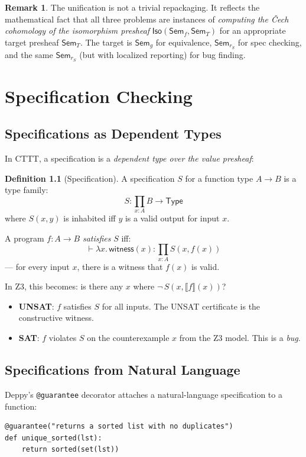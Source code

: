 \documentclass[11pt,a4paper]{report}
\theoremstyle{definition}
\newtheorem{definition}{Definition}[chapter]
\newtheorem{remark}[definition]{Remark}
\theoremstyle{plain}
\newcommand{\den}[1]{\llbracket #1 \rrbracket}
\newcommand{\Type}{\mathsf{Type}}
\newcommand{\Sem}{\mathsf{Sem}}
\newcommand{\Iso}{\mathsf{Iso}}
\begin{document}
\begin{remark}
The unification is not a trivial repackaging.  It reflects the
mathematical fact that all three problems are instances of
\emph{computing the \v{C}ech cohomology of the isomorphism presheaf}
$\Iso(\Sem_f, \Sem_T)$ for an appropriate target presheaf $\Sem_T$.
The target is $\Sem_g$ for equivalence, $\Sem_{r_S}$ for spec
checking, and the same $\Sem_{r_S}$ (but with localized reporting)
for bug finding.
\end{remark}


\chapter{Specification Checking}
\label{ch:spec-checking}

\section{Specifications as Dependent Types}

In CTTT, a specification is a \emph{dependent type over the value
presheaf}:

\begin{definition}[Specification]
A specification $S$ for a function type $A \to B$ is a type family:
\[
  S : \prod_{x : A} B \to \Type
\]
where $S(x, y)$ is inhabited iff $y$ is a valid output for input $x$.
\end{definition}

A program $f : A \to B$ \emph{satisfies} $S$ iff:
\[
  \vdash \lambda x.\, \mathsf{witness}(x) :
  \prod_{x : A} S(x, f(x))
\]
--- for every input $x$, there is a witness that $f(x)$ is valid.

In Z3, this becomes: is there any $x$ where $\lnot\,S(x, \den{f}(x))$?
\begin{itemize}
  \item \textbf{UNSAT}: $f$ satisfies $S$ for all inputs.
    The UNSAT certificate is the constructive witness.
  \item \textbf{SAT}: $f$ violates $S$ on the counterexample $x$
    from the Z3 model.  This is a \emph{bug}.
\end{itemize}

\section{Specifications from Natural Language}

Deppy's \texttt{@guarantee} decorator attaches a natural-language
specification to a function:
\begin{lstlisting}
@guarantee("returns a sorted list with no duplicates")
def unique_sorted(lst):
    return sorted(set(lst))
\end{lstlisting}
\end{document}
